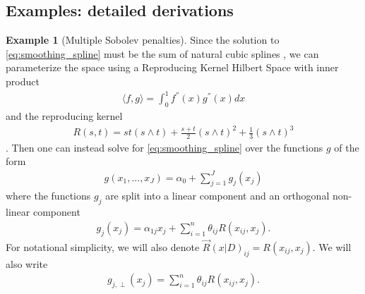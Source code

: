 \documentclass[10pt]{book}
\theoremstyle{definition}
\newtheorem{example}{Example}
\begin{document}
\subsection{Examples: detailed derivations}

\begin{example}[Multiple Sobolev penalties]
	Since the solution to \eqref{eq:smoothing_spline} must be the sum of natural cubic splines \citep{buja1989linear}, we can parameterize the space using a Reproducing Kernel Hilbert Space with inner product
	\begin{align}
	\langle f, g \rangle = \int_{0}^1 f^{''}(x) g^{''}(x) dx
	\end{align}
	and the reproducing kernel
	\begin{align}
	R(s, t) = st(s \wedge t)
	+ \frac{s + t}{2} (s \wedge t)^2
	+ \frac{1}{3}
	(s \wedge t)^3
	\end{align}
	\citep{heckman2012theory}.
	Then one can instead solve for \eqref{eq:smoothing_spline} over the functions $g$ of the form
	\begin{align}
	g(x_1,..., x_J) = \alpha_0 + \sum_{j=1}^J g_j(x_j)
	\end{align}
	where the functions $g_j$ are split into a linear component and an orthogonal non-linear component
	\begin{align}
	g_j(x_j) = \alpha_{1j} x_j + \sum_{i=1}^n \theta_{ij} R(x_{ij}, x_j).
	\end{align}
	For notational simplicity, we will also denote $\vec{R}(x | D)_{ij} = R(x_{ij}, x_j)$.
	We will also write
	\begin{align}
	g_{j, \perp}(x_j) = \sum_{i=1}^n \theta_{ij} R(x_{ij}, x_j).
	\end{align}
	

\end{example}
\end{document}

